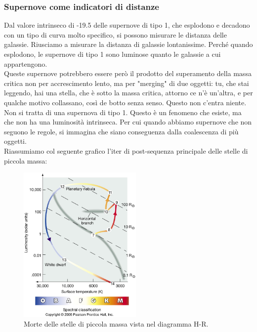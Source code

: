 \documentclass[a4paper,11pt]{article}
\begin{document}
\subsubsection{Supernove come indicatori di distanze}
Dal valore intrinseco di -19.5 delle supernove di tipo 1, che esplodono e decadono con un tipo di curva molto specifico, si possono misurare le distanza delle galassie. Riusciamo a misurare la distanza di galassie lontanissime. Perché quando esplodono, le supernove di tipo 1 sono luminose quanto le galassie a cui appartengono. \\
Queste supernove potrebbero essere però il prodotto del superamento della massa critica non per accrescimento lento, ma per "merging" di due oggetti: tu, che stai leggendo, hai una stella, che è sotto la massa critica, attorno ce n'è un'altra, e per qualche motivo collassano, così de botto senza senso. Questo non c'entra niente. Non si tratta di una supernova di tipo 1. Questo è un fenomeno che esiste, ma che non ha una luminosità intrinseca. Per cui quando abbiamo supernove che non seguono le regole, si immagina che siano conseguenza dalla coalescenza di più oggetti. \\ Riassumiamo col seguente grafico l'iter di post-sequenza principale delle stelle di piccola massa:
\begin{figure}[h!!]
        \centering
        \includegraphics[width=6cm]{lezione 28 novembre/mortestellepiccolamassa.jpg}
        \caption{Morte delle stelle di piccola massa vista nel diagramma H-R.}
        \label{lezione 28 novembre/mortestellepiccolamassa.jpg}
    \end{figure}
\newpage
\end{document}
